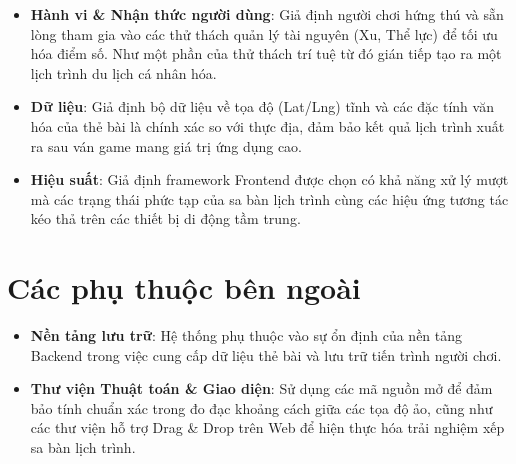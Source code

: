 \begin{itemize}[topsep=0pt, itemsep=2.5pt, leftmargin=1.5cm]
    \item \textbf{Hành vi \& Nhận thức người dùng}: Giả định người chơi hứng thú và sẵn lòng tham gia vào các thử thách quản lý tài nguyên (Xu, Thể lực) để tối ưu hóa điểm số. Như một phần của thử thách trí tuệ từ đó gián tiếp tạo ra một lịch trình du lịch cá nhân hóa.

    \item \textbf{Dữ liệu}: Giả định bộ dữ liệu về tọa độ (Lat/Lng) tĩnh và các đặc tính văn hóa của thẻ bài là chính xác so với thực địa, đảm bảo kết quả lịch trình xuất ra sau ván game mang giá trị ứng dụng cao.

    \item \textbf{Hiệu suất}: Giả định framework Frontend được chọn có khả năng xử lý mượt mà các trạng thái phức tạp của sa bàn lịch trình cùng các hiệu ứng tương tác kéo thả trên các thiết bị di động tầm trung.
\end{itemize}

\section{Các phụ thuộc bên ngoài}

\begin{itemize}[topsep=0pt, itemsep=2.5pt, leftmargin=1.5cm]
    \item \textbf{Nền tảng lưu trữ}: Hệ thống phụ thuộc vào sự ổn định của nền tảng Backend trong việc cung cấp dữ liệu thẻ bài và lưu trữ tiến trình người chơi.
    \item \textbf{Thư viện Thuật toán \& Giao diện}: Sử dụng các mã nguồn mở để đảm bảo tính chuẩn xác trong đo đạc khoảng cách giữa các tọa độ ảo, cũng như các thư viện hỗ trợ Drag \& Drop trên Web để hiện thực hóa trải nghiệm xếp sa bàn lịch trình.
\end{itemize}